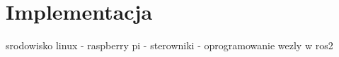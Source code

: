 \section*{Implementacja} 
srodowisko linux - raspberry pi - sterowniki - oprogramowanie
wezly w ros2
